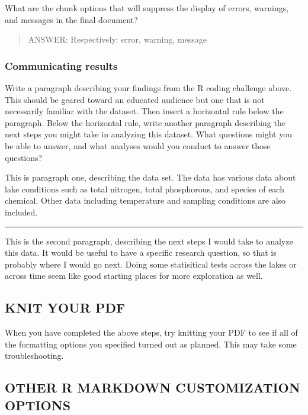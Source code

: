 \documentclass[
]{article}
\begin{document}
What are the chunk options that will suppress the display of errors,
warnings, and messages in the final document?

\begin{quote}
ANSWER: Respectively: error, warning, message
\end{quote}

\hypertarget{communicating-results}{%
\subsubsection{Communicating results}\label{communicating-results}}

Write a paragraph describing your findings from the R coding challenge
above. This should be geared toward an educated audience but one that is
not necessarily familiar with the dataset. Then insert a horizontal rule
below the paragraph. Below the horizontal rule, write another paragraph
describing the next steps you might take in analyzing this dataset. What
questions might you be able to answer, and what analyses would you
conduct to answer those questions?

This is paragraph one, describing the data set. The data has various
data about lake conditions such as total nitrogen, total phosphorous,
and species of each chemical. Other data including temperature and
sampling conditions are also included.

\begin{center}\rule{0.5\linewidth}{0.5pt}\end{center}

This is the second paragraph, describing the next steps I would take to
analyze this data. It would be useful to have a specific research
question, so that is probably where I would go next. Doing some
statisitical tests across the lakes or across time seem like good
starting places for more exploration as well.

\hypertarget{knit-your-pdf}{%
\subsection{KNIT YOUR PDF}\label{knit-your-pdf}}

When you have completed the above steps, try knitting your PDF to see if
all of the formatting options you specified turned out as planned. This
may take some troubleshooting.

\hypertarget{other-r-markdown-customization-options}{%
\subsection{OTHER R MARKDOWN CUSTOMIZATION
OPTIONS}\label{other-r-markdown-customization-options}}
\end{document}
